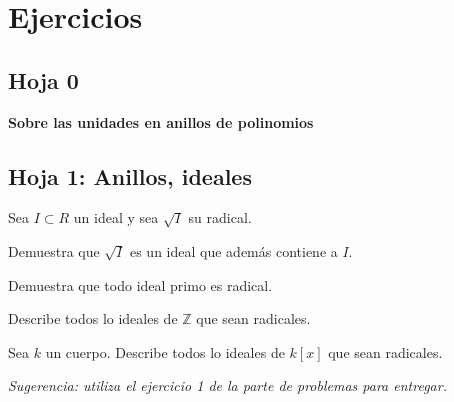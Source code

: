 \chapter{Ejercicios}
\setcounter{section}{-1} %
\section{Hoja 0}

\begin{problem}
\ppart
\ppart
\ppart
\solution
\end{problem}

\begin{problem}

\solution
\end{problem}

\begin{problem}
{\bf Sobre las unidades en anillos de polinomios}
\ppart
\ppart
\solution
\end{problem}

\begin{problem}

\solution
\end{problem}

\begin{problem}

\solution
\end{problem}

\begin{problem}
\ppart
\ppart
\ppart
\solution
\end{problem}

\begin{problem}
\ppart
\ppart
\ppart
\solution
\end{problem}

\begin{problem}
\ppart
\ppart
\ppart
\ppart
\ppart
\ppart
\ppart
\solution
\end{problem}
\section{Hoja 1: Anillos, ideales}

\begin{problem}
{}

Sea $I\subset R$ un ideal  y sea $\sqrt{I}$ su radical.

\ppart Demuestra que $\sqrt{I}$ es un ideal que adem\'as contiene a $I$.

\ppart Demuestra que todo ideal primo es radical.

\ppart Describe todos lo ideales de ${\mathbb Z}$ que sean radicales.

\ppart Sea $k$ un cuerpo. Describe todos lo ideales de $k[x]$ que sean radicales.

{\em Sugerencia: utiliza el ejercicio 1  de la parte de problemas para entregar.}

\solution
\end{problem}


